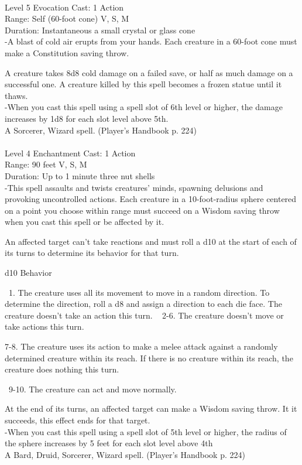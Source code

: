 \documentclass[10pt,twocolumn]{report}
\begin{document}
 \\
Level 5 \quad Evocation \quad Cast: 1 Action\\
Range: Self (60-foot cone) \quad V, S, M \\
Duration: Instantaneous \quad a small crystal or glass cone\\
-A blast of cold air erupts from your hands. 
Each creature in a 60-foot cone must make a Constitution saving throw. 

A creature takes 8d8 cold damage on a failed save, or half as much damage on a successful one. A creature killed by this spell becomes a frozen statue until it thaws.\\
-When you cast this spell using a spell slot of 6th level or higher, the damage increases by 1d8 for each slot level above 5th.\\
A Sorcerer, Wizard spell. (Player's Handbook p. 224) \\


 \\
Level 4 \quad Enchantment \quad Cast: 1 Action\\
Range: 90 feet \quad V, S, M \\
Duration: Up to 1 minute \quad three nut shells\\
-This spell assaults and twists creatures’ minds, spawning delusions and provoking uncontrolled actions. Each creature in a 10-foot-radius sphere centered on a point you choose within range must succeed on a Wisdom saving throw when you cast this spell or be affected by it. 

An affected target can’t take reactions and must roll a d10 at the start of each of its turns to determine its behavior for that turn. 

d10   Behavior 

 1. The creature uses all its movement to move in a random direction. To determine the direction, roll a d8 and assign a direction to each die face. The creature doesn’t take an action this turn. 
 
2-6. The creature doesn’t move or take actions this turn. 

7-8. The creature uses its action to make a melee attack against a randomly determined creature within its reach. If there is no creature within its reach, the creature does nothing this turn. 

 9-10. The creature can act and move normally. 

At the end of its turns, an affected target can make a Wisdom saving throw. It it succeeds, this effect ends for that target.\\
-When you cast this spell using a spell slot of 5th level or higher, the radius of the sphere increases by 5 feet for each slot level above 4th\\
A Bard, Druid, Sorcerer, Wizard spell. (Player's Handbook p. 224) \\
\end{document}
